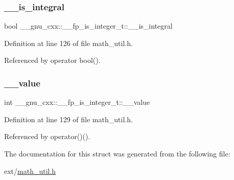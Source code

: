 \subsubsection{\texorpdfstring{\+\_\+\+\_\+is\+\_\+integral}{\_\_is\_integral}}
{\footnotesize\ttfamily bool \+\_\+\+\_\+gnu\+\_\+cxx\+::\+\_\+\+\_\+fp\+\_\+is\+\_\+integer\+\_\+t\+::\+\_\+\+\_\+is\+\_\+integral}



Definition at line 126 of file math\+\_\+util.\+h.



Referenced by operator bool().

\mbox{\label{struct____gnu__cxx_1_1____fp__is__integer__t_ad30e10c2e2dc2b23d42b4bbbf5592425}} 
\subsubsection{\texorpdfstring{\+\_\+\+\_\+value}{\_\_value}}
{\footnotesize\ttfamily int \+\_\+\+\_\+gnu\+\_\+cxx\+::\+\_\+\+\_\+fp\+\_\+is\+\_\+integer\+\_\+t\+::\+\_\+\+\_\+value}



Definition at line 129 of file math\+\_\+util.\+h.



Referenced by operator()().



The documentation for this struct was generated from the following file\+:\begin{DoxyCompactItemize}
\item 
ext/\hyperlink{math__util_8h}{math\+\_\+util.\+h}\end{DoxyCompactItemize}
